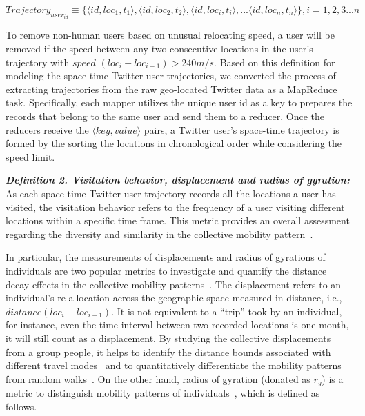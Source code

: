 \documentclass[ijgi,article,accept,moreauthors,pdftex,10pt,a4paper]{mdpi}
\theoremstyle{mdpi}
\newcounter{ex}
\newcounter{re}
\theoremstyle{mdpidefinition}
\begin{document}
$Trajectory_{user_{id}} \equiv \lbrace \langle id, loc_{1}, t_{1}\rangle, \langle id, loc_{2}, t_{2}\rangle, \langle id, loc_{i}, t_{i}\rangle, ... \langle id, loc_{n}, t_{n}\rangle \rbrace, i = 1, 2, 3...n$
\newline

To remove non-human users based on unusual relocating speed, a user will be removed if the speed between any two consecutive locations in the user's trajectory with $speed$ $(loc_{i} - loc_{i-1}) > 240 m/s $.
Based on this definition for modeling the space-time Twitter user trajectories, we converted the process of extracting trajectories from the raw geo-located Twitter data as a MapReduce task. Specifically, each mapper utilizes the unique user id as a key to prepares the records that belong to the same user and send them to a reducer. Once the reducers receive the $\langle key, value\rangle$ pairs, a Twitter user's space-time trajectory is formed by the sorting the locations in chronological order while considering the speed limit.
\newline

\noindent\emph{\textbf{Definition 2. Visitation behavior, displacement and radius of gyration:}} As each space-time Twitter user trajectory records all the locations a user has visited, the visitation behavior refers to the frequency of a user visiting different locations within a specific time frame.
This metric provides an overall assessment regarding the diversity and similarity in the collective mobility pattern~\cite{gao2012exploring}.

In particular, the measurements of displacements and radius of gyrations of individuals are two popular metrics to investigate and quantify the distance decay effects in the collective mobility patterns~\cite{gonzalez2008understanding}.
The displacement refers to an individual's re-allocation across the geographic space measured in distance, i.e., $distance (loc_{i} - loc_{i-1})$.
It is not equivalent to a ``trip'' took by an individual, for instance, even the time interval between two recorded locations is one month, it will still count as a displacement.
By studying the collective displacements from a group people, it helps to identify the distance bounds associated with different travel modes~\cite{Jurdak2015} and to quantitatively differentiate the mobility patterns from random walks~\cite{brockmann2006scaling}.
On the other hand, radius of gyration (donated as $r_{g}$) is a metric to distinguish mobility patterns of individuals~\cite{gonzalez2008understanding}, which is defined as follows.
\newline
\end{document}
